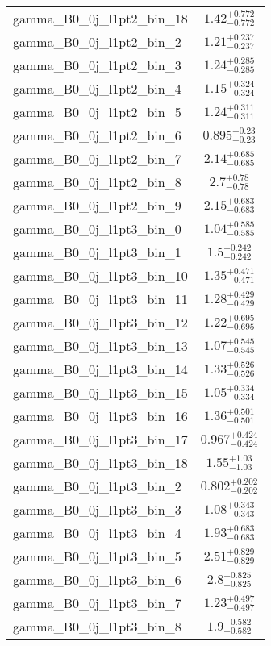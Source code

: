 \begin{tabular}{|l|c|}
gamma\_B0\_0j\_l1pt2\_bin\_18 & $1.42^{+0.772}_{-0.772}$ \\
gamma\_B0\_0j\_l1pt2\_bin\_2 & $1.21^{+0.237}_{-0.237}$ \\
gamma\_B0\_0j\_l1pt2\_bin\_3 & $1.24^{+0.285}_{-0.285}$ \\
gamma\_B0\_0j\_l1pt2\_bin\_4 & $1.15^{+0.324}_{-0.324}$ \\
gamma\_B0\_0j\_l1pt2\_bin\_5 & $1.24^{+0.311}_{-0.311}$ \\
gamma\_B0\_0j\_l1pt2\_bin\_6 & $0.895^{+0.23}_{-0.23}$ \\
gamma\_B0\_0j\_l1pt2\_bin\_7 & $2.14^{+0.685}_{-0.685}$ \\
gamma\_B0\_0j\_l1pt2\_bin\_8 & $2.7^{+0.78}_{-0.78}$ \\
gamma\_B0\_0j\_l1pt2\_bin\_9 & $2.15^{+0.683}_{-0.683}$ \\
gamma\_B0\_0j\_l1pt3\_bin\_0 & $1.04^{+0.585}_{-0.585}$ \\
gamma\_B0\_0j\_l1pt3\_bin\_1 & $1.5^{+0.242}_{-0.242}$ \\
gamma\_B0\_0j\_l1pt3\_bin\_10 & $1.35^{+0.471}_{-0.471}$ \\
gamma\_B0\_0j\_l1pt3\_bin\_11 & $1.28^{+0.429}_{-0.429}$ \\
gamma\_B0\_0j\_l1pt3\_bin\_12 & $1.22^{+0.695}_{-0.695}$ \\
gamma\_B0\_0j\_l1pt3\_bin\_13 & $1.07^{+0.545}_{-0.545}$ \\
gamma\_B0\_0j\_l1pt3\_bin\_14 & $1.33^{+0.526}_{-0.526}$ \\
gamma\_B0\_0j\_l1pt3\_bin\_15 & $1.05^{+0.334}_{-0.334}$ \\
gamma\_B0\_0j\_l1pt3\_bin\_16 & $1.36^{+0.501}_{-0.501}$ \\
gamma\_B0\_0j\_l1pt3\_bin\_17 & $0.967^{+0.424}_{-0.424}$ \\
gamma\_B0\_0j\_l1pt3\_bin\_18 & $1.55^{+1.03}_{-1.03}$ \\
gamma\_B0\_0j\_l1pt3\_bin\_2 & $0.802^{+0.202}_{-0.202}$ \\
gamma\_B0\_0j\_l1pt3\_bin\_3 & $1.08^{+0.343}_{-0.343}$ \\
gamma\_B0\_0j\_l1pt3\_bin\_4 & $1.93^{+0.683}_{-0.683}$ \\
gamma\_B0\_0j\_l1pt3\_bin\_5 & $2.51^{+0.829}_{-0.829}$ \\
gamma\_B0\_0j\_l1pt3\_bin\_6 & $2.8^{+0.825}_{-0.825}$ \\
gamma\_B0\_0j\_l1pt3\_bin\_7 & $1.23^{+0.497}_{-0.497}$ \\
gamma\_B0\_0j\_l1pt3\_bin\_8 & $1.9^{+0.582}_{-0.582}$ \\

\end{tabular}
